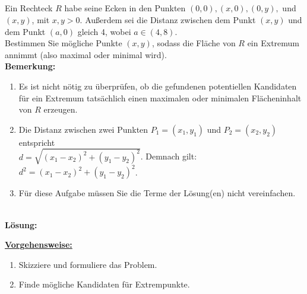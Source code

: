 \newpage
\subsection*{}
Ein Rechteck $ R $ habe seine Ecken in den Punkten $ (0,0),(x,0),(0,y), $ und $ (x,y) $, mit $ x,y > 0 $.
Außerdem sei die Distanz zwischen dem Punkt $ (x,y)  $ und dem Punkt $ (a,0) $ gleich 4, wobei $ a \in (4,8) $.\\
Bestimmen Sie mögliche Punkte $ (x,y) $, sodass die Fläche von $ R $ ein Extremum annimmt (also maximal oder minimal wird).\\
\textbf{Bemerkung:} 
\begin{enumerate}[label=(\arabic*)]
	\item Es ist nicht nötig zu überprüfen, ob die gefundenen potentiellen Kandidaten für ein Extremum tatsächlich einen maximalen oder minimalen Flächeninhalt von $ R $ erzeugen.
	\item Die Distanz zwischen zwei Punkten $ P_1 = (x_1,y_1) $ und $ P_2 = ( x_2,y_2) $ entspricht\\
	$ d = \sqrt{(x_1 - x_2)^2 + (y_1 - y_2)^2} $.
	Demnach gilt: $ d^2 = (x_1 -x_2)^2 + (y_1 - y_2)^2 $.
	\item  Für diese Aufgabe müssen Sie die Terme der Lösung(en) nicht vereinfachen.
\end{enumerate}
\ \\
\textbf{Lösung:}
\begin{mdframed}
\underline{\textbf{Vorgehensweise:}}
\begin{enumerate}
\item Skizziere und formuliere das Problem.
\item Finde mögliche Kandidaten für Extrempunkte.
\end{enumerate}
\end{mdframed}


